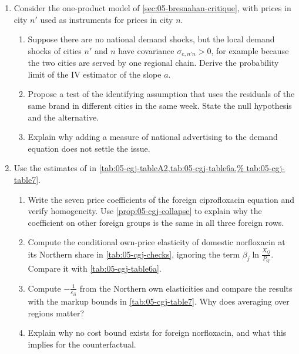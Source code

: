 \begin{enumerate}[label=\arabic*., leftmargin=*, itemsep=6pt]
\item Consider the one-product model of \cref{sec:05-bresnahan-critique}, with prices in city $n'$ used as
instruments for prices in city $n$.
\begin{enumerate}[label=(\alph*)]
  \item Suppose there are no national demand shocks, but the local demand shocks of cities $n'$ and $n$ have
  covariance $\sigma_{e,n'n} > 0$, for example because the two cities are served by one regional chain. Derive
  the probability limit of the IV estimator of the slope $a$.
  \item Propose a test of the identifying assumption that uses the residuals of the same brand in different cities
  in the same week. State the null hypothesis and the alternative.
  \item Explain why adding a measure of national advertising to the demand equation does not settle the issue.
\end{enumerate}

\item Use the estimates of \citet{ChaudhuriGoldbergJia2006} in \cref{tab:05-cgj-tableA2,tab:05-cgj-table6a,%
tab:05-cgj-table7}.
\begin{enumerate}[label=(\alph*)]
  \item Write the seven price coefficients of the foreign ciprofloxacin equation and verify homogeneity. Use
  \cref{prop:05-cgj-collapse} to explain why the coefficient on other foreign groups is the same in all three
  foreign rows.
  \item Compute the conditional own-price elasticity of domestic norfloxacin at its Northern share in
  \cref{tab:05-cgj-checks}, ignoring the term $\beta_j\ln\frac{X_Q}{P_Q}$. Compare it with \cref{tab:05-cgj-table6a}.
  \item Compute $-\frac{1}{\varepsilon_{ii}}$ from the Northern own elasticities and compare the results with the
  markup bounds in \cref{tab:05-cgj-table7}. Why does averaging over regions matter?
  \item Explain why no cost bound exists for foreign norfloxacin, and what this implies for the counterfactual.
\end{enumerate}


\end{enumerate}
